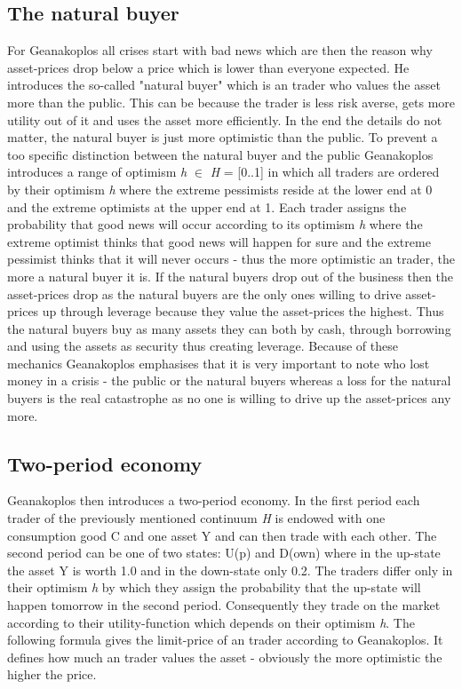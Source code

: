 \documentclass[../Bachelorarbeit.tex]{subfiles}
\begin{document}
\subsection{The natural buyer}
For Geanakoplos all crises start with bad news which are then the reason why asset-prices drop below a price which is lower than everyone expected. He introduces the so-called "natural buyer" which is an trader who values the asset more than the public. This can be because the trader is less risk averse, gets more utility out of it and uses the asset more efficiently. In the end the details do not matter, the natural buyer is just more optimistic than the public.
To prevent a too specific distinction between the natural buyer and the public Geanakoplos introduces a range of optimism \textit{h} $\in$ \textit{H} = [0..1] in which all traders are ordered by their optimism \textit{h} where the extreme pessimists reside at the lower end at 0 and the extreme optimists at the upper end at 1. Each trader assigns the probability that good news will occur according to its optimism \textit{h} where the extreme optimist thinks that good news will happen for sure and the extreme pessimist thinks that it will never occurs - thus the more optimistic an trader, the more a natural buyer it is. If the natural buyers drop out of the business then the asset-prices drop as the natural buyers are the only ones willing to drive asset-prices up through leverage because they value the asset-prices the highest. Thus the natural buyers buy as many assets they can both by cash, through borrowing and using the assets as security thus creating leverage. Because of these mechanics Geanakoplos emphasises that it is very important to note who lost money in a crisis - the public or the natural buyers whereas a loss for the natural buyers is the real catastrophe as no one is willing to drive up the asset-prices any more.

\subsection{Two-period economy}
Geanakoplos then introduces a two-period economy. In the first period each trader of the previously mentioned continuum \textit{H} is endowed with one consumption good C and one asset Y and can then trade with each other. The second period can be one of two states: U(p) and D(own) where in the up-state the asset Y is worth 1.0 and in the down-state only 0.2. The traders differ only in their optimism \textit{h} by which they assign the probability that the up-state will happen tomorrow in the second period. Consequently they trade on the market according to their utility-function which depends on their optimism \textit{h}. The following formula gives the limit-price of an trader according to Geanakoplos. It defines how much an trader values the asset - obviously the more optimistic the higher the price.
\end{document}
